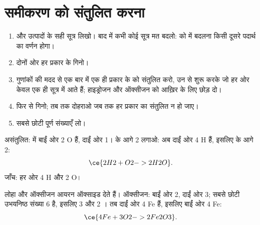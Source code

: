 \section{समीकरण को संतुलित करना}

\begin{method}\label{met:g8:balanced-equations:balance}
\begin{enumerate}
  \item {} और उत्पादों के सही सूत्र लिखो। बाद में कभी कोई सूत्र
        मत बदलो:  को  में बदलना
        किसी दूसरे पदार्थ का वर्णन होगा।
  \item दोनों ओर हर प्रकार के  गिनो।
  \item गुणांकों की मदद से एक बार में एक ही प्रकार के  को संतुलित करो,
        उन  से शुरू करके जो हर ओर केवल एक ही सूत्र में आते हैं;
        हाइड्रोजन और ऑक्सीजन को आख़िर के लिए छोड़ दो।
  \item फिर से गिनो; तब तक दोहराओ जब तक हर प्रकार का  संतुलित न हो जाए।
  \item सबसे छोटी पूर्ण संख्याएँ लो।
\end{enumerate}
\end{method}

\begin{example}[हाइड्रोजन और ऑक्सीजन]\label{ex:g8:balanced-equations:water}
असंतुलित:  %
में बाईं ओर 2 O हैं, दाईं ओर 1।  के आगे 2 लगाओ: अब दाईं ओर 4 H
हैं, इसलिए  के आगे 2:
\[
  \ce{2H2 + O2 -> 2H2O}.
\]
जाँच: हर ओर 4 H और 2 O।
\end{example}

\begin{example}[ऑक्सीजन में लोहे का जलना]\label{ex:g8:balanced-equations:iron-oxide}
लोहा और ऑक्सीजन आयरन ऑक्साइड  देते हैं। ऑक्सीजन: बाईं ओर 2,
दाईं ओर 3; सबसे छोटी उभयनिष्ठ संख्या 6 है, इसलिए 3  और 2
। तब दाईं ओर 4 Fe हैं, इसलिए बाईं ओर 4 Fe:
\[
  \ce{4Fe + 3O2 -> 2Fe2O3}.
\]
\end{example}

